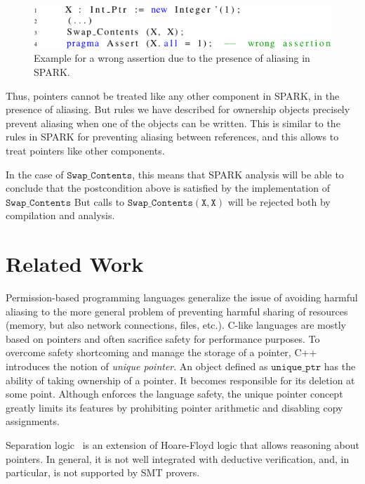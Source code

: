 \documentclass{llncs}
\newcommand\var[1]{\ensuremath{\mathtt{#1}}}
\begin{document}
\begin{figure}[htb!]
\centering
  \captionsetup{justification=centering,margin=0.6cm}
   \includegraphics[]{spark_ex1_exp}
	\caption{Example for a wrong assertion due to the presence of aliasing in SPARK.}
   \label{fig:spark_ex1_exp}
\end{figure}

Thus, pointers cannot be treated like any other component in SPARK, in the presence of aliasing. But rules we have described for ownership objects precisely prevent
aliasing when one of the objects can be written. This is similar to the rules in SPARK for preventing aliasing between references, and this allows to treat pointers
like other components.

In the case of \var{Swap\_Contents}, this means that SPARK analysis will be able to conclude that the postcondition above is satisfied by the implementation of \var{Swap\_Contents}
But calls to \var{Swap\_Contents(X,X)} will be rejected both by compilation and analysis.


\section{Related Work}


Permission-based programming languages generalize the issue of avoiding harmful aliasing to the more general problem of preventing harmful sharing of resources
(memory, but also network connections, files, etc.). C-like languages are mostly based on pointers and often sacrifice safety for performance purposes.
To overcome safety shortcoming and manage the storage of a pointer, C++ introduces the notion of \textit{unique pointer}. An object defined as \var{unique\_ptr}
has the ability of taking ownership of a pointer. It becomes responsible for its deletion at some point. Although enforces the language safety, the unique
pointer concept greatly limits its features by prohibiting pointer arithmetic and disabling copy assignments.

Separation logic~\cite{Reynolds02} is an extension of Hoare-Floyd logic that allows reasoning about pointers. In general, it is not well integrated with deductive
verification, and, in particular, is not supported by SMT provers.
\end{document}
